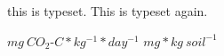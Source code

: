 \documentclass{article}
\begin{document}
	
	this is typeset. \iffalse This is not. \fi This is typeset again.
	
	$ mg\ CO_2$-$C * kg^{-1} * day^{-1} $	
	$ mg * kg\ soil^{-1} $
\end{document}
